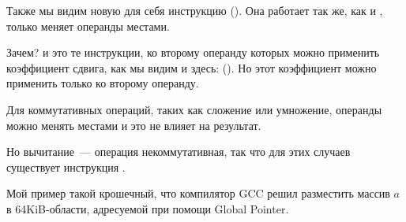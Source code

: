 Также мы видим новую для себя инструкцию \RSB ().
Она работает так же, как и \SUB, только меняет операнды местами.

Зачем?
\SUB и \RSB это те инструкции, ко второму операнду которых можно применить коэффициент сдвига, как мы видим и здесь: (). 
Но этот коэффициент можно применить только ко второму операнду.

Для коммутативных операций, таких как сложение или умножение, 
операнды можно менять местами и это не влияет на результат.

Но вычитание~--- операция некоммутативная, так что для этих случаев существует инструкция \RSB.



Мой пример такой крошечный, что компилятор GCC решил разместить массив $a$ в 64KiB-области,
адресуемой при помощи Global Pointer.



